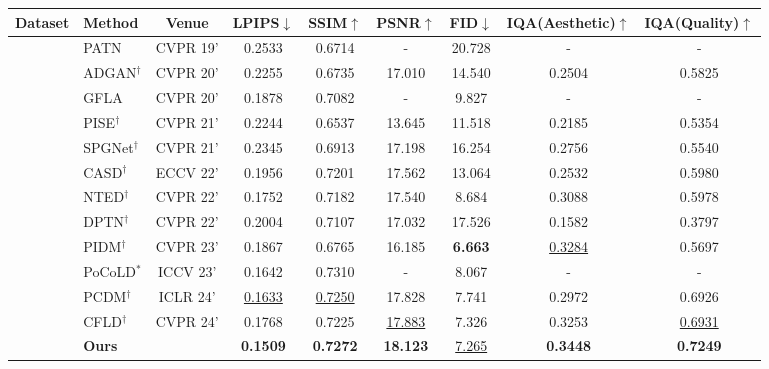 
\begin{tabular}{c l c c c c c c c}
    \toprule
        \textbf{Dataset} & \textbf{Method} & \textbf{Venue} & \textbf{LPIPS$\downarrow$} & \textbf{SSIM$\uparrow$} & \textbf{PSNR$\uparrow$} & \textbf{FID$\downarrow$} & \textbf{IQA(Aesthetic)$\uparrow$} & \textbf{IQA(Quality)$\uparrow$}  \\
    \midrule
             &  PATN\cite{zhu2019progressive} & CVPR 19' & 0.2533 & 0.6714 & - & 20.728 & - & -\\
             &  ADGAN$^\dagger$\cite{men2020controllable} & CVPR 20' & 0.2255 & 0.6735& 17.010 & 14.540 & 0.2504 & 0.5825\\
             &  GFLA\cite{ren2020deep} & CVPR 20' & 0.1878 & 0.7082& - & 9.827 & - & - \\
             &  PISE$^\dagger$\cite{zhang2021pise} & CVPR 21' & 0.2244 & 0.6537& 13.645 & 11.518 & 0.2185 & 0.5354\\
             &  SPGNet$^\dagger$\cite{lv2021learning} & CVPR 21' & 0.2345 & 0.6913& 17.198 & 16.254  & 0.2756 & 0.5540\\
             &  CASD$^\dagger$\cite{zhou2022cross} & ECCV 22' & 0.1956 & 0.7201 & 17.562 & 13.064 & 0.2532 & 0.5980 \\
             &  NTED$^\dagger$\cite{ren2022neural} & CVPR 22' & 0.1752 & 0.7182 & 17.540 & 8.684 & 0.3088 & 0.5978\\
             &  DPTN$^\dagger$\cite{zhang2022exploring} & CVPR 22' & 0.2004 & 0.7107 & 17.032 & 17.526 & 0.1582 & 0.3797 \\
             &  PIDM$^\dagger$ \cite{bhunia2023person} & CVPR 23' & 0.1867 & 0.6765 & 16.185 & \textbf{6.663} & \underline{0.3284} & 0.5697 \\
             &  \color{gray}PoCoLD$^\ast$\cite{han2023controllable} & \color{gray}ICCV 23' & \color{gray}0.1642 & \color{gray}0.7310 & - & \color{gray}8.067 & - & - \\
             &  PCDM$^\dagger$\cite{shen2024advancing} & ICLR 24' & \underline{0.1633} & \underline{0.7250} & 17.828 & 7.741 & 0.2972 & 0.6926\\   %
             &  CFLD$^\dagger$\cite{lu2024coarse} & CVPR 24' & 0.1768 & 0.7225 & \underline{17.883} & 7.326 & 0.3253 & \underline{0.6931} \\    %
             &  \textbf{Ours} &  & \textbf{0.1509} & \textbf{0.7272} & \textbf{18.123} & \underline{7.265} & \textbf{0.3448} & \textbf{0.7249}\\

\end{tabular}

